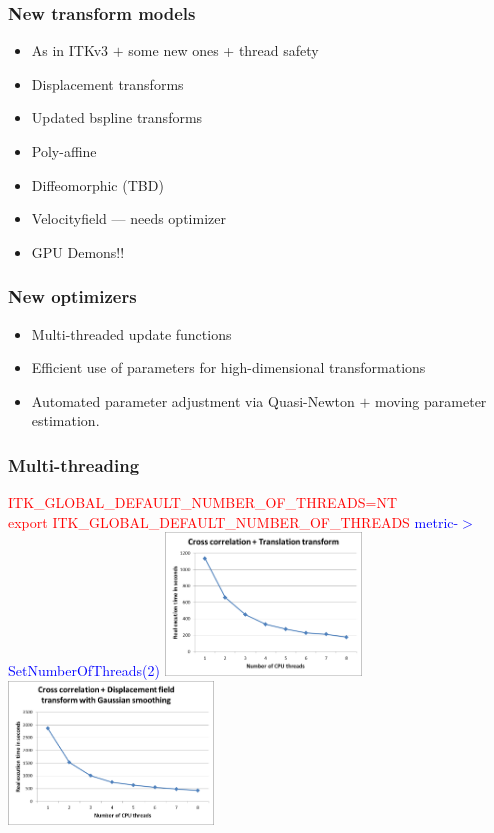 \begin{frame}
\frametitle{New transform models}
\Large
\begin{itemize}
\item As in ITKv3 $+$ some new ones + thread safety 
\item Displacement transforms
\item Updated bspline transforms
\item Poly-affine
\item Diffeomorphic (TBD)
\item Velocityfield --- needs optimizer
\item GPU Demons!!
\end{itemize}
\end{frame}

\begin{frame}
\frametitle{New optimizers}
\Large
\begin{itemize}
\item Multi-threaded update functions
\item Efficient use of parameters for high-dimensional transformations
\item Automated parameter adjustment via Quasi-Newton $+$ moving parameter estimation.
\end{itemize}
\end{frame}

\begin{frame}
\Large
\frametitle{Multi-threading}
\textcolor{red}{ ITK\_GLOBAL\_DEFAULT\_NUMBER\_OF\_THREADS=NT}\\
\textcolor{red}{export ITK\_GLOBAL\_DEFAULT\_NUMBER\_OF\_THREADS}
\vskip20pt
\textcolor{blue}{metric-$>$SetNumberOfThreads(2)}
\includegraphics[height=1.5in]{../Art/cctran}~~\includegraphics[height=1.5in]{../Art/ccfield}
\end{frame}

